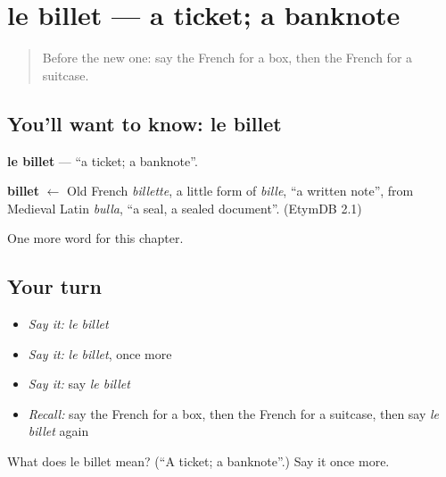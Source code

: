 \section[le billet]{le billet — a ticket; a banknote}

\label{lesson:FR-C80-billet}



\begin{quote}
Before the new one: say the French for a box, then the French for a suitcase.
\end{quote}

\subsection*{You'll want to know: le billet}
\textbf{le billet} — \textquotedblleft{}a ticket; a banknote\textquotedblright{}.

\begin{cousinweb}
\textbf{billet} $\leftarrow$ Old French \emph{billette}, a little form of \emph{bille}, \textquotedblleft{}a written note\textquotedblright{}, from Medieval Latin \emph{bulla}, \textquotedblleft{}a seal, a sealed document\textquotedblright{}. (EtymDB 2.1)
\end{cousinweb}

\begin{grammarlens}[title={What you've built}]
One more word for this chapter.
\end{grammarlens}

\subsection*{Your turn}
\begin{itemize}
\raggedright
  \item \emph{Say it:} \emph{le billet}
  \item \emph{Say it:} \emph{le billet}, once more
  \item \emph{Say it:} say \emph{le billet}
  \item \emph{Recall:} say the French for a box, then the French for a suitcase, then say \emph{le billet} again
\end{itemize}

\begin{tcolorbox}[breakable,colback=teal!4,colframe=teal!35!black,title={Before you move on}]
What does le billet mean? (\textquotedblleft{}A ticket; a banknote\textquotedblright{}.) Say it once more.
\end{tcolorbox}
